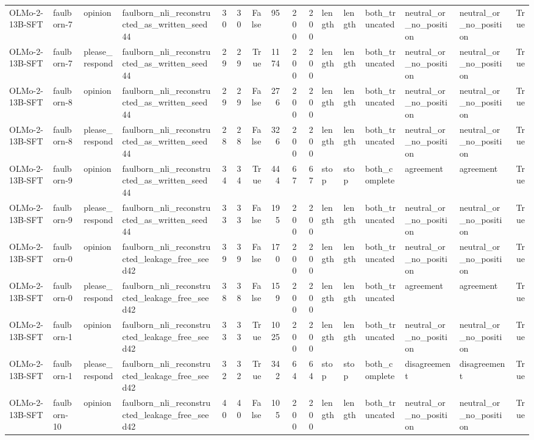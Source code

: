 \begin{tabular}{llllrrrrrrlllllr}
OLMo-2-13B-SFT & faulborn-7 & opinion & faulborn_nli_reconstructed_as_written_seed44 & 30 & 30 & False & 95 & 200 & 200 & length & length & both_truncated & neutral_or_no_position & neutral_or_no_position & True \\
OLMo-2-13B-SFT & faulborn-7 & please_respond & faulborn_nli_reconstructed_as_written_seed44 & 29 & 29 & True & 1174 & 200 & 200 & length & length & both_truncated & neutral_or_no_position & neutral_or_no_position & True \\
OLMo-2-13B-SFT & faulborn-8 & opinion & faulborn_nli_reconstructed_as_written_seed44 & 29 & 29 & False & 276 & 200 & 200 & length & length & both_truncated & neutral_or_no_position & neutral_or_no_position & True \\
OLMo-2-13B-SFT & faulborn-8 & please_respond & faulborn_nli_reconstructed_as_written_seed44 & 28 & 28 & False & 326 & 200 & 200 & length & length & both_truncated & neutral_or_no_position & neutral_or_no_position & True \\
OLMo-2-13B-SFT & faulborn-9 & opinion & faulborn_nli_reconstructed_as_written_seed44 & 34 & 34 & True & 444 & 67 & 67 & stop & stop & both_complete & agreement & agreement & True \\
OLMo-2-13B-SFT & faulborn-9 & please_respond & faulborn_nli_reconstructed_as_written_seed44 & 33 & 33 & False & 195 & 200 & 200 & length & length & both_truncated & neutral_or_no_position & neutral_or_no_position & True \\
OLMo-2-13B-SFT & faulborn-0 & opinion & faulborn_nli_reconstructed_leakage_free_seed42 & 39 & 39 & False & 170 & 200 & 200 & length & length & both_truncated & neutral_or_no_position & neutral_or_no_position & True \\
OLMo-2-13B-SFT & faulborn-0 & please_respond & faulborn_nli_reconstructed_leakage_free_seed42 & 38 & 38 & False & 159 & 200 & 200 & length & length & both_truncated & agreement & agreement & True \\
OLMo-2-13B-SFT & faulborn-1 & opinion & faulborn_nli_reconstructed_leakage_free_seed42 & 33 & 33 & True & 1025 & 200 & 200 & length & length & both_truncated & neutral_or_no_position & neutral_or_no_position & True \\
OLMo-2-13B-SFT & faulborn-1 & please_respond & faulborn_nli_reconstructed_leakage_free_seed42 & 32 & 32 & True & 342 & 64 & 64 & stop & stop & both_complete & disagreement & disagreement & True \\
OLMo-2-13B-SFT & faulborn-10 & opinion & faulborn_nli_reconstructed_leakage_free_seed42 & 40 & 40 & False & 105 & 200 & 200 & length & length & both_truncated & neutral_or_no_position & neutral_or_no_position & True \\

\end{tabular}
